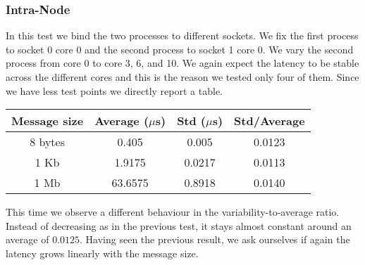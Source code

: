 \subsubsection{Intra-Node}
    In this test we bind the two processes to different sockets. We fix
    the first process to socket 0 core 0 and the second process to socket
    1 core 0. We vary the second process from core 0 to core 3, 6, and 10.
    We again expect the latency to be stable across the different cores and
    this is the reason we tested only four of them. Since we have less test
    points we directly report a table.
    \begin{table}[H]
        \centering
        \begin{tabular}{|c|c|c|c|}
            \hline
            \textbf{Message size} & \textbf{Average ($\mu$s)} & \textbf{Std ($\mu$s)} & \textbf{Std/Average} \\
            \hline
            8 bytes & 0.405 & 0.005 & 0.0123 \\
            1 Kb & 1.9175 & 0.0217 & 0.0113 \\
            1 Mb & 63.6575 & 0.8918 & 0.0140 \\
            \hline
        \end{tabular}
    \end{table}
    This time we observe a different behaviour in the variability-to-average
    ratio. Instead of decreasing as in the previous test, it stays almost
    constant around an average of $0.0125$. Having seen the previous result,
    we ask ourselves if again the latency grows linearly with the message size.
